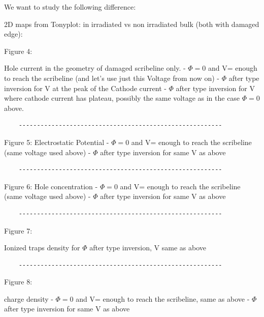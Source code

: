 \documentclass[preprint,12pt]{elsarticle}
\begin{document}
We want to study the following difference:

2D maps  from Tonyplot:
in irradiated vs non irradiated bulk (both with damaged edge):

Figure 4:

Hole current in the geometry of damaged scribeline only.
- $\Phi =0 $ and V= enough to reach the scribeline (and let's use just this Voltage from now on)
- $\Phi$ after type inversion for V at the peak of the Cathode current
- $\Phi$ after type inversion for V where cathode current has plateau, possibly the same voltage as in the case $\Phi =0 $ above.

\begin{verbatim}
    --------------------------------------------------------
\end{verbatim}


Figure 5:
Electrostatic Potential 
- $\Phi =0 $ and V= enough to reach the scribeline (same voltage used above)
- $\Phi$ after type inversion for same V as above


\begin{verbatim}
    --------------------------------------------------------
\end{verbatim}
Figure 6:
Hole concentration 
- $\Phi =0 $ and V= enough to reach the scribeline (same voltage used above)
- $\Phi$ after type inversion for same V as above

\begin{verbatim}
    --------------------------------------------------------
\end{verbatim}

Figure 7:

Ionized traps density for $\Phi$ after type inversion, V same as above

\begin{verbatim}
    --------------------------------------------------------
\end{verbatim}

Figure 8:


charge density
- $\Phi =0 $ and V= enough to reach the scribeline, same as above
- $\Phi$ after type inversion for same V as above
\end{document}
